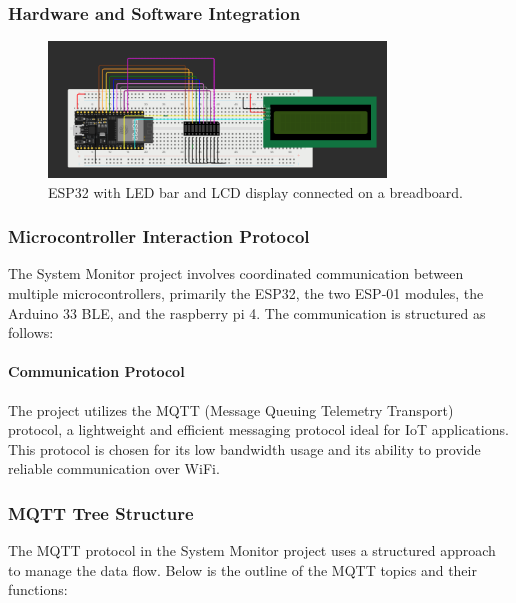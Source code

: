 \subsubsection{Hardware and Software Integration}
\begin{figure}[ht]
    \centering
    \includegraphics[width=0.8\textwidth]{../images/activity_monitor_scheme.png}
    \caption{ESP32 with LED bar and LCD display connected on a breadboard.}
    \label{fig:esp32_system_monitor}
\end{figure}

\subsubsection{Microcontroller Interaction Protocol}
The System Monitor project involves coordinated communication between multiple microcontrollers, primarily the ESP32, the two ESP-01 modules, the Arduino 33 BLE, and the raspberry pi 4. The communication is structured as follows:

\paragraph{Communication Protocol}
The project utilizes the MQTT (Message Queuing Telemetry Transport) protocol, a lightweight and efficient messaging protocol ideal for IoT applications. This protocol is chosen for its low bandwidth usage and its ability to provide reliable communication over WiFi.

\subsubsection{MQTT Tree Structure}
The MQTT protocol in the System Monitor project uses a structured approach to manage the data flow. Below is the outline of the MQTT topics and their functions:

